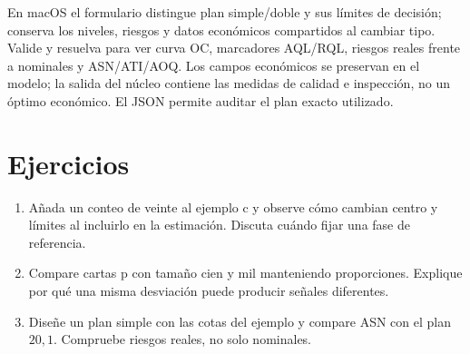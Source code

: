En macOS el formulario distingue plan simple/doble y sus límites de decisión;
conserva los niveles, riesgos y datos económicos compartidos al cambiar tipo.
Valide y resuelva para ver curva OC, marcadores AQL/RQL, riesgos reales frente a
nominales y ASN/ATI/AOQ. Los campos económicos se preservan en el modelo; la
salida del núcleo contiene las medidas de calidad e inspección, no un óptimo
económico. El JSON permite auditar el plan exacto utilizado.

\section{Ejercicios}
\begin{enumerate}
\item Añada un conteo de veinte al ejemplo c y observe cómo cambian centro y
límites al incluirlo en la estimación. Discuta cuándo fijar una fase de referencia.
\item Compare cartas p con tamaño cien y mil manteniendo proporciones.
Explique por qué una misma desviación puede producir señales diferentes.
\item Diseñe un plan simple con las cotas del ejemplo y compare ASN con el
plan \(20,1\). Compruebe riesgos reales, no solo nominales.
\end{enumerate}
